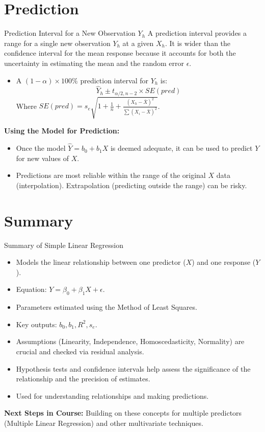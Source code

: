 \documentclass[aspectratio=169]{beamer}
\begin{document}
\section{Prediction}
\begin{frame}{Prediction Interval for a New Observation $Y_h$}
  A prediction interval provides a range for a single new observation $Y_h$ at a given $X_h$. It is wider than the confidence interval for the mean response because it accounts for both the uncertainty in estimating the mean and the random error $\epsilon$.
  \begin{itemize}
    \item A $(1-\alpha) \times 100\%$ prediction interval for $Y_h$ is:
    \begin{equation*}
      \hat{Y}_h \pm t_{\alpha/2, n-2} \times SE(pred)
    \end{equation*}
    Where $SE(pred) = s_e \sqrt{1 + \frac{1}{n} + \frac{(X_h - \bar{X})^2}{\sum (X_i - \bar{X})^2}}$.
  \end{itemize}
  \textbf{Using the Model for Prediction:}
  \begin{itemize}
    \item Once the model $\hat{Y} = b_0 + b_1 X$ is deemed adequate, it can be used to predict $Y$ for new values of $X$.
    \item Predictions are most reliable within the range of the original $X$ data (interpolation). Extrapolation (predicting outside the range) can be risky.
  \end{itemize}
\end{frame}

\section{Summary}
\begin{frame}{Summary of Simple Linear Regression}
  \begin{itemize}
    \item Models the linear relationship between one predictor ($X$) and one response ($Y$).
    \item Equation: $Y = \beta_0 + \beta_1 X + \epsilon$.
    \item Parameters estimated using the Method of Least Squares.
    \item Key outputs: $b_0, b_1, R^2, s_e$.
    \item Assumptions (Linearity, Independence, Homoscedasticity, Normality) are crucial and checked via residual analysis.
    \item Hypothesis tests and confidence intervals help assess the significance of the relationship and the precision of estimates.
    \item Used for understanding relationships and making predictions.
  \end{itemize}
  \textbf{Next Steps in Course:} Building on these concepts for multiple predictors (Multiple Linear Regression) and other multivariate techniques.
\end{frame}
\end{document}
